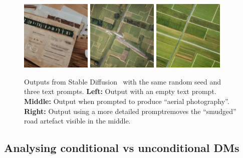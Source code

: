 \begin{figure}[t]
    \centering
    \includegraphics[width=0.3\textwidth]{figs/2sdm/sd_uncond.png}
    \hfill
    \includegraphics[width=0.3\textwidth]{figs/2sdm/uncond-aerial-photo.jpg}
    \hfill
    \includegraphics[width=0.3\textwidth]{figs/2sdm/cond-aerial-photo.jpg}
    \caption{Outputs from Stable Diffusion~\citep{rombach2022high} with the same random seed and three text prompts. \textbf{Left:} Output with an empty text prompt. \textbf{Middle:} Output when prompted to produce ``aerial photography''. \textbf{Right:} Output using a more detailed prompt\protect\footnotemark removes the ``smudged'' road artefact visible in the middle.}
    \label{fig:stable-diffusion-example}
\end{figure}

\subsection{Analysing conditional vs unconditional DMs} \label{sec:2sdm-cond-vs-uncond-dgms}

